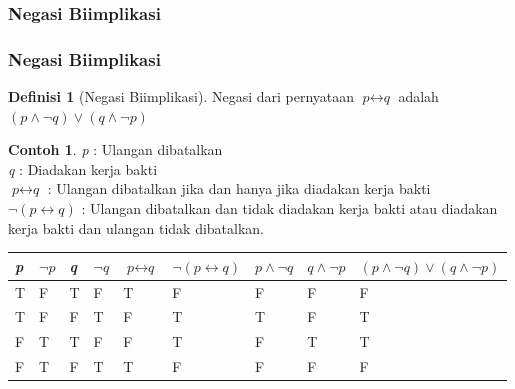 \documentclass[handout]{beamer}
\theoremstyle{definition}
\newtheorem{definisi}[theorem]{Definisi}
\theoremstyle{example}
\newtheorem{contoh}[theorem]{Contoh}
\begin{document}
\subsubsection{Negasi Biimplikasi}
\begin{frame}[shrink]
	\frametitle{Negasi Biimplikasi}
\begin{definisi}[Negasi Biimplikasi]
	Negasi dari pernyataan $\textit{p}\leftrightarrow\textit{q}$  adalah $(\textit{p}\wedge\neg\textit{q})\vee(\textit{q}\wedge\neg\textit{p})$    		 	
\end{definisi}
\begin{contoh}
	\textit{p} : Ulangan dibatalkan \\
	\textit{q} : Diadakan kerja bakti \\
	$\textit{p}\leftrightarrow\textit{q}$ : Ulangan dibatalkan jika dan hanya jika diadakan kerja bakti \\
	$\neg(\textit{p}\leftrightarrow\textit{q})$ : Ulangan dibatalkan dan tidak diadakan kerja bakti atau diadakan kerja bakti dan ulangan tidak dibatalkan.	\\
 \tiny{	
	\begin{tabular}{ | l | l | l | l | l | l | l |l |l |}
		\hline
		\textit{p} & $\neg\textit{p}$ & \textit{q} & $\neg\textit{q}$ & $\textit{p}\leftrightarrow\textit{q}$ & $\neg(\textit{p}\leftrightarrow\textit{q})$ & $\textit{p}\wedge\neg\textit{q}$ & $\textit{q}\wedge\neg\textit{p}$ & $(\textit{p}\wedge\neg\textit{q})\vee(\textit{q}\wedge\neg\textit{p})$\\ \hline
		T & F & T & F & T & F & F & F & F\\ \hline
		T & F & F & T & F & T & T & F & T\\ \hline
		F & T & T & F & F & T & F & T & T\\ \hline
		F & T & F & T & T & F & F & F & F\\     		 
		\hline
	\end{tabular}}
\end{contoh}
\end{frame}
\end{document}
